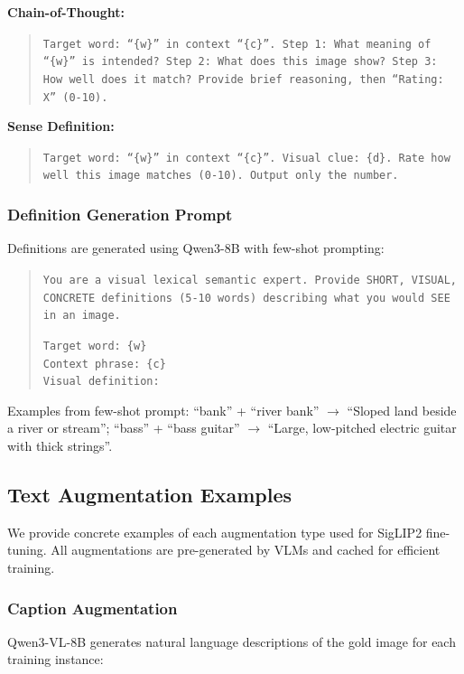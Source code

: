 \documentclass[11pt]{article}
\begin{document}
\textbf{Chain-of-Thought:}
\begin{quote}
\small
\texttt{Target word: ``\{w\}'' in context ``\{c\}''. Step 1: What meaning of ``\{w\}'' is intended? Step 2: What does this image show? Step 3: How well does it match? Provide brief reasoning, then ``Rating: X'' (0-10).}
\end{quote}

\textbf{Sense Definition:}
\begin{quote}
\small
\texttt{Target word: ``\{w\}'' in context ``\{c\}''. Visual clue: \{d\}. Rate how well this image matches (0-10). Output only the number.}
\end{quote}

\subsubsection{Definition Generation Prompt}

Definitions are generated using Qwen3-8B with few-shot prompting:
\begin{quote}
\small
\texttt{You are a visual lexical semantic expert. Provide SHORT, VISUAL, CONCRETE definitions (5-10 words) describing what you would SEE in an image.}

\texttt{Target word: \{w\}}\\
\texttt{Context phrase: \{c\}}\\
\texttt{Visual definition:}
\end{quote}

Examples from few-shot prompt: ``bank'' + ``river bank'' $\rightarrow$ ``Sloped land beside a river or stream''; ``bass'' + ``bass guitar'' $\rightarrow$ ``Large, low-pitched electric guitar with thick strings''.

\subsection{Text Augmentation Examples}

We provide concrete examples of each augmentation type used for SigLIP2 fine-tuning. All augmentations are pre-generated by VLMs and cached for efficient training.

\subsubsection{Caption Augmentation}

Qwen3-VL-8B generates natural language descriptions of the gold image for each training instance:
\end{document}
